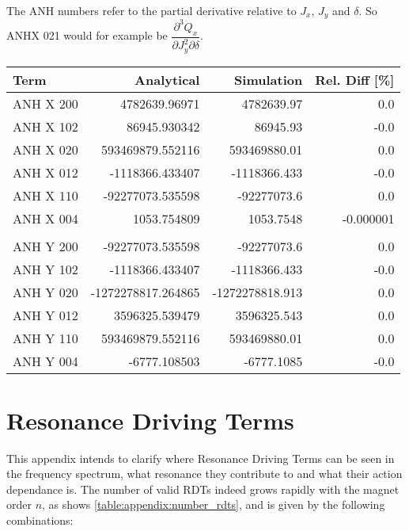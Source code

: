 The ANH numbers refer to the partial derivative relative to \(J_x\),
\(J_y\) and \(\delta\). So ANHX 021 would for example be
\(\dfrac{\partial^3 Q_x}{\partial J_y^2 \partial \delta}\).

\begin{center}
\begin{tabular}{lrrr}
\toprule
       Term &         Analytical &      Simulation & Rel. Diff [\%] \\
\midrule
  ANH X 200 &      4782639.96971 &      4782639.97 &           0.0 \\
  ANH X 102 &       86945.930342 &        86945.93 &          -0.0 \\
  ANH X 020 &   593469879.552116 &    593469880.01 &           0.0 \\
  ANH X 012 &    -1118366.433407 &    -1118366.433 &          -0.0 \\
  ANH X 110 &   -92277073.535598 &     -92277073.6 &           0.0 \\
  ANH X 004 &        1053.754809 &       1053.7548 &     -0.000001 \\
            &                    &                 &               \\
  ANH Y 200 &   -92277073.535598 &     -92277073.6 &           0.0 \\
  ANH Y 102 &    -1118366.433407 &    -1118366.433 &          -0.0 \\
  ANH Y 020 & -1272278817.264865 & -1272278818.913 &           0.0 \\
  ANH Y 012 &     3596325.539479 &     3596325.543 &           0.0 \\
  ANH Y 110 &   593469879.552116 &    593469880.01 &           0.0 \\
  ANH Y 004 &       -6777.108503 &      -6777.1085 &          -0.0 \\
\bottomrule
\end{tabular}
\end{center}



\chapter{Resonance Driving Terms}
\thumbforappendix

This appendix intends to clarify where Resonance Driving Terms can be seen in the frequency
spectrum, what resonance they contribute to and what their action dependance is.  
The number of valid RDTs indeed grows rapidly with the magnet order $n$, as shows
\cref{table:appendix:number_rdts}, and is given by the following combinations:


